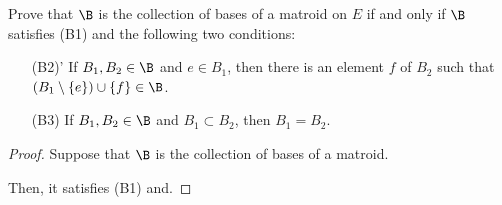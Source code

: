 \prob
{
    Prove that $\B$ is the collection of bases of a matroid on 
    $E$ if and only if $\B$ satisfies (B1) and the following two conditions:
    
    \begin{itemize}
        \item[(B2)'] If $B_1, B_2 \in \B$ and $e \in B_1$, then there is an element $f$ of
                        $B_2$ such that $(B_1 \setminus \{e\}) \cup \{f\} \in \B$.
                        
        \item[(B3)] If $B_1, B_2 \in \B$ and $B_1 \subset B_2$, then $B_1 = B_2$.
    \end{itemize}
}

\begin{proof}
    Suppose that $\B$ is the collection of bases of a matroid.
    
    Then, it satisfies (B1) and.
\end{proof}